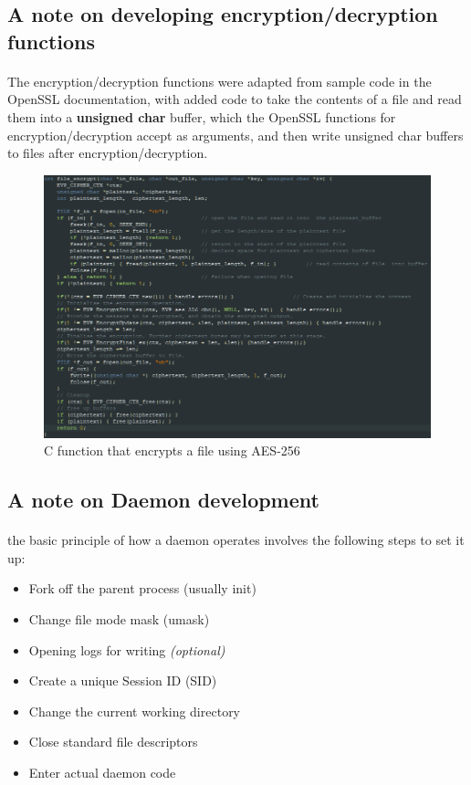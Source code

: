 \documentclass{article}
\begin{document}
    \subsection{A note on developing encryption/decryption functions}
        \paragraph{}The encryption/decryption functions were adapted from sample code in the OpenSSL documentation, with added code to take the contents of a file and read them into a \textbf{unsigned char} buffer, which the OpenSSL functions for encryption/decryption accept as arguments, and then write unsigned char buffers to files after encryption/decryption.

        \begin{figure}[htbp]
            \centering\includegraphics[width=\textwidth]{encrypt_function_screenshot_1.png}
            \caption{C function that encrypts a file using AES-256}
            \label{fig:my_label}
        \end{figure}
    \newpage
    \subsection{A note on Daemon development}
        \paragraph{}the basic principle of how a daemon operates involves the following steps to set it up:
        \begin{itemize}
            \item Fork off the parent process (usually init)
            \item Change file mode mask (umask)
            \item Opening logs for writing \textit{(optional)}
            \item Create a unique Session ID (SID)
            \item Change the current working directory
            \item Close standard file descriptors
            \item Enter actual daemon code
        \end{itemize}
\end{document}
